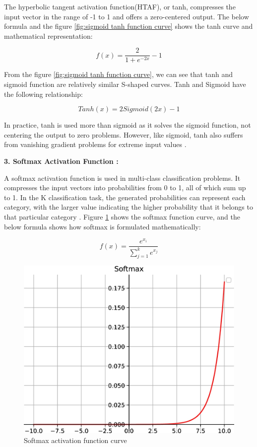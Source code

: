 The hyperbolic tangent activation function(HTAF), or tanh, compresses the input vector in the range of -1 to 1 and offers a zero-centered output. The below formula and the figure \ref{fig:sigmoid tanh function curve} shows the tanh curve and mathematical representation:

\[
    f(x) = \frac{2}{1 + e^{-2x}} - 1
\]

From the figure \ref{fig:sigmoid tanh function curve}, we can see that tanh and sigmoid function are relatively similar S-shaped curves. Tanh and Sigmoid have the following relationship:

\[
    Tanh(x) = 2Sigmoid(2x) - 1
\]

In practice, tanh is used more than sigmoid as it solves the sigmoid function, not centering the output to zero problems. However, like sigmoid, tanh also suffers from vanishing gradient problems for extreme input values \cite{Zhao2024}.

\textbf{3. Softmax Activation Function :}

A softmax activation function is used in multi-class classification problems. It compresses the input vectors into probabilities from 0 to 1, all of which sum up to 1. In the K classification task, the generated probabilities can represent each category, with the larger value indicating the higher probability that it belongs to that particular category \cite{Zhao2024}. Figure \ref{fig:softmax function curve} shows the softmax function curve, and the below formula shows how softmax is formulated mathematically:

\[
    f(x) = \frac{e^{x_i}}{\sum_{j=1}^{k} e^{x_j}}
\]

\begin{figure}[H]
    \centering
    \includegraphics[width=1\textwidth]{Rohit_Master_Thesis//Images/softmax.png}
    \caption{Softmax activation function curve \cite{Zhao2024}}
    \label{fig:softmax function curve}
\end{figure}

